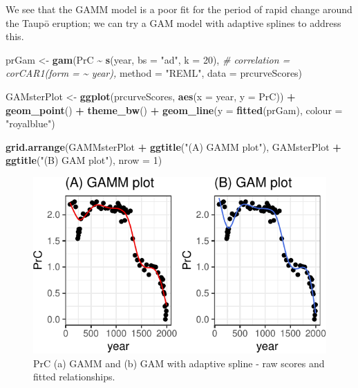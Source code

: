 \documentclass[nofonts,]{tufte-handout}
\newenvironment{Shaded}{\begin{snugshade}}{\end{snugshade}}
\newcommand{\AttributeTok}[1]{\textcolor[rgb]{0.13,0.29,0.53}{#1}}
\newcommand{\CommentTok}[1]{\textcolor[rgb]{0.56,0.35,0.01}{\textit{#1}}}
\newcommand{\DecValTok}[1]{\textcolor[rgb]{0.00,0.00,0.81}{#1}}
\newcommand{\FunctionTok}[1]{\textcolor[rgb]{0.13,0.29,0.53}{\textbf{#1}}}
\newcommand{\NormalTok}[1]{#1}
\newcommand{\OtherTok}[1]{\textcolor[rgb]{0.56,0.35,0.01}{#1}}
\newcommand{\SpecialCharTok}[1]{\textcolor[rgb]{0.81,0.36,0.00}{\textbf{#1}}}
\newcommand{\StringTok}[1]{\textcolor[rgb]{0.31,0.60,0.02}{#1}}
\begin{document}
We see that the GAMM model is a poor fit for the period of rapid change
around the Taupō eruption; we can try a GAM model with adaptive splines
to address this.

\begin{Shaded}
\begin{Highlighting}[]
\NormalTok{prGam }\OtherTok{\textless{}{-}} \FunctionTok{gam}\NormalTok{(PrC }\SpecialCharTok{\textasciitilde{}}  \FunctionTok{s}\NormalTok{(year, }\AttributeTok{bs =} \StringTok{"ad"}\NormalTok{, }\AttributeTok{k =} \DecValTok{20}\NormalTok{),}
               \CommentTok{\# correlation = corCAR1(form = \textasciitilde{} year),}
               \AttributeTok{method =} \StringTok{"REML"}\NormalTok{,}
               \AttributeTok{data =}\NormalTok{ prcurveScores)}



\NormalTok{GAMsterPlot }\OtherTok{\textless{}{-}} \FunctionTok{ggplot}\NormalTok{(prcurveScores, }\FunctionTok{aes}\NormalTok{(}\AttributeTok{x =}\NormalTok{ year, }\AttributeTok{y =}\NormalTok{ PrC)) }\SpecialCharTok{+}
  \FunctionTok{geom\_point}\NormalTok{() }\SpecialCharTok{+}
  \FunctionTok{theme\_bw}\NormalTok{() }\SpecialCharTok{+} 
  \FunctionTok{geom\_line}\NormalTok{(}\AttributeTok{y =} \FunctionTok{fitted}\NormalTok{(prGam), }\AttributeTok{colour =} \StringTok{"royalblue"}\NormalTok{)}

\FunctionTok{grid.arrange}\NormalTok{(GAMMsterPlot }\SpecialCharTok{+} \FunctionTok{ggtitle}\NormalTok{(}\StringTok{"(A) GAMM plot"}\NormalTok{), }
\NormalTok{             GAMsterPlot }\SpecialCharTok{+} \FunctionTok{ggtitle}\NormalTok{(}\StringTok{"(B) GAM plot"}\NormalTok{),}
             \AttributeTok{nrow =} \DecValTok{1}\NormalTok{)}
\end{Highlighting}
\end{Shaded}

\begin{figure}
\includegraphics{Technical-supplement_files/figure-latex/unnamed-chunk-11-1} \caption[PrC (a) GAMM and (b) GAM with adaptive spline - raw scores and fitted relationships]{PrC (a) GAMM and (b) GAM with adaptive spline - raw scores and fitted relationships.}\label{fig:unnamed-chunk-11}
\end{figure}
\end{document}
